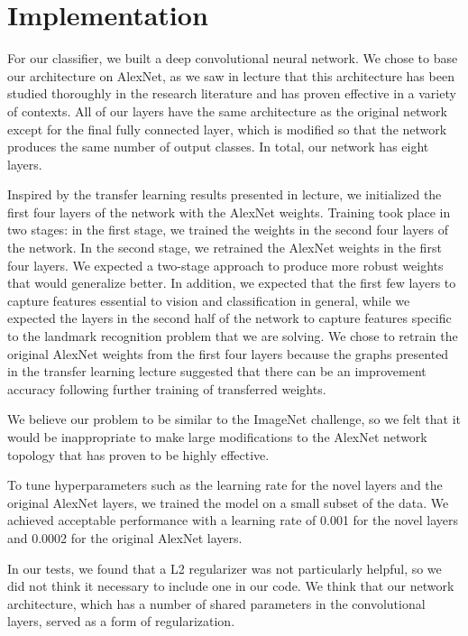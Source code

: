 \section{Implementation}
For our classifier, we built a deep convolutional neural network. We chose to base our architecture on AlexNet, as we saw in lecture that this architecture has been studied thoroughly in the research literature and has proven effective in a variety of contexts. All of our layers have the same architecture as the original network except for the final fully connected layer, which is modified so that the network produces the same number of output classes. In total, our network has eight layers.

Inspired by the transfer learning results presented in lecture, we initialized the first four layers of the network with the AlexNet weights. Training took place in two stages: in the first stage, we trained the weights in the second four layers of the network. In the second stage, we retrained the AlexNet weights in the first four layers. We expected a two-stage approach to produce more robust weights that would generalize better. In addition, we expected that the first few layers to capture features essential to vision and classification in general, while we expected the layers in the second half of the network to capture features specific to the landmark recognition problem that we are solving. We chose to retrain the original AlexNet weights from the first four layers because the graphs presented in the transfer learning lecture suggested that there can be an improvement accuracy following further training of transferred weights.

We believe our problem to be similar to the ImageNet challenge, so we felt that it would be inappropriate to make large modifications to the AlexNet network topology that has proven to be highly effective.

To tune hyperparameters such as the learning rate for the novel layers and the original AlexNet layers, we trained the model on a small subset of the data. We achieved acceptable performance with a learning rate of 0.001 for the novel layers and 0.0002 for the original AlexNet layers.

In our tests, we found that a L2 regularizer was not particularly helpful, so we did not think it necessary to include one in our code. We think that our network architecture, which has a number of shared parameters in the convolutional layers, served as a form of regularization.